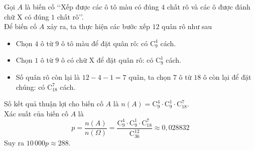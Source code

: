 \begin{ex}
{		Gọi $A$ là biến cố \lq\lq Xếp được các ô tô màu có đúng $4$ chất rô và các ô được đánh chữ X có đúng $1$ chất rô\rq\rq.\\
		Để biến cố $A$ xảy ra, ta thực hiện các bước xếp $12$ quân rô như sau
		\begin{itemize}
			\item Chọn $4$ ô từ $9$ ô tô màu để đặt quân rô: có $\mathrm{C}_9^4$ cách.
			\item Chọn $1$ ô từ $9$ ô có chữ X để đặt quân rô: có $\mathrm{C}_9^1$ cách.
			\item Số quân rô còn lại là $12 - 4 - 1 = 7$ quân, ta chọn $7$ ô từ $18$ ô còn lại để đặt chúng: có $\mathrm{C}_{18}^7$ cách.
		\end{itemize}
		Số kết quả thuận lợi cho biến cố $A$ là $n(A) = \mathrm{C}_9^4 \cdot \mathrm{C}_9^1 \cdot \mathrm{C}_{18}^7$.\\
		Xác suất của biến cố $A$ là
		\[p = \dfrac{n(A)}{n(\Omega)} = \dfrac{\mathrm{C}_9^4 \cdot \mathrm{C}_9^1 \cdot \mathrm{C}_{18}^7}{\mathrm{C}_{36}^{12}} \approx 0{,}028832\]
		Suy ra $10\,000p \approx 288$.
	}
\end{ex}

